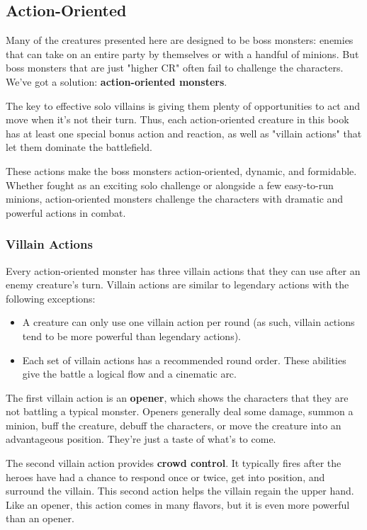 \documentclass[10pt,a4paper,twoside,bg=print,twocolumn,openany,nodeprecatedcode]{dndbook}
\begin{document}
\subsection{Action-Oriented}
Many of the creatures presented here are designed to be boss monsters: enemies that can take on an entire party by themselves or with a handful of minions. But boss monsters that are just "higher CR" often fail to challenge the characters. We've got a solution: \textbf{action-oriented monsters}.

The key to effective solo villains is giving them plenty of opportunities to act and move when it's not their turn. Thus, each action-oriented creature in this book has at least one special bonus action and reaction, as well as "villain actions" that let them dominate the battlefield.

These actions make the boss monsters action-oriented, dynamic, and formidable. Whether fought as an exciting solo challenge or alongside a few easy-to-run minions, action-oriented monsters challenge the characters with dramatic and powerful actions in combat.

\subsubsection{Villain Actions}
Every action-oriented monster has three villain actions that they can use after an enemy creature's turn. Villain actions are similar to legendary actions with the following exceptions:


\begin{itemize}
\item A creature can only use one villain action per round (as such, villain actions tend to be more powerful than legendary actions).
\item Each set of villain actions has a recommended round order. These abilities give the battle a logical flow and a cinematic arc.
\end{itemize}

The first villain action is an \textbf{opener}, which shows the characters that they are not battling a typical monster. Openers generally deal some damage, summon a minion, buff the creature, debuff the characters, or move the creature into an advantageous position. They're just a taste of what's to come.

The second villain action provides \textbf{crowd control}. It typically fires after the heroes have had a chance to respond once or twice, get into position, and surround the villain. This second action helps the villain regain the upper hand. Like an opener, this action comes in many flavors, but it is even more powerful than an opener.
\end{document}
